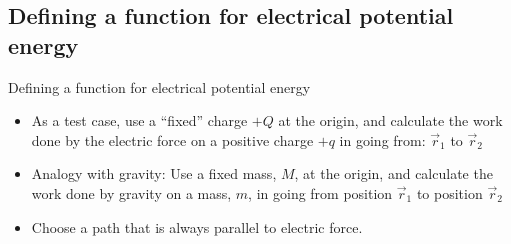 \documentclass[aspectratio=169,
hyperref={colorlinks,urlcolor=blue}
]{beamer}
\begin{document}
\subsection{Defining a function for electrical potential energy}
\label{subsec:definingafunctionforelectricalpotentialenergy}
\begin{frame}{Defining a function for electrical potential energy}
\begin{itemize}
\item As a test case, use a ``fixed'' charge $+Q$ at the origin, and calculate the work done by the electric force on a positive charge $+q$ in going from: $\vec r_1$ to $\vec r_2$
\item Analogy with gravity: Use a fixed mass, $M$, at the origin, and calculate the work done by gravity on a mass, $m$, in going from position $\vec r_1$ to position $\vec r_2$
\item Choose a path that is always parallel to electric force.
\begin{center}
\end{center}
\end{itemize}
\end{frame}
\end{document}
